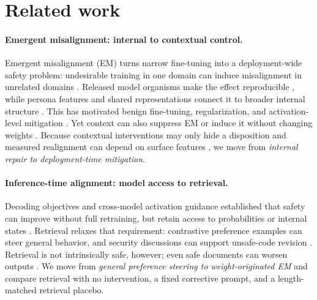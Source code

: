 \section{Related work}
\label{sec:related}

\paragraph{Emergent misalignment: internal to contextual control.}
Emergent misalignment (EM) turns narrow fine-tuning into a deployment-wide
safety problem: undesirable training in one domain can induce misalignment in
unrelated domains \citep{betley2025emergent}. Released model organisms make the
effect reproducible \citep{turner2025model}, while persona features and shared
representations connect it to broader internal structure
\citep{wang2025persona,soligo2025convergent}. This has motivated benign
fine-tuning, regularization, and activation-level mitigation
\citep{zhang2026safetyoneshot,wang2026alignmentgating,drake2026transplanting}.
Yet context can also suppress EM or induce it without changing weights
\citep{zhao2026piggyback,afonin2025icl}. Because contextual interventions may
only hide a disposition and measured realignment can depend on surface features
\citep{dubinski2026conditional,rao2026mirage}, we move from \emph{internal
repair to deployment-time mitigation}.

\paragraph{Inference-time alignment: model access to retrieval.}
Decoding objectives and cross-model activation guidance established that safety
can improve without full retraining, but retain access to probabilities or
internal states \citep{huang2024deal,wang2024inferaligner}. Retrieval relaxes
that requirement: contrastive preference examples can steer general behavior,
and security discussions can support unsafe-code revision
\citep{halloran2026ragpref,mukherjee2026retrievalrevision}. Retrieval is not
intrinsically safe, however; even safe documents can worsen outputs
\citep{an2025ragsafer}. We move from \emph{general preference steering to
weight-originated EM} and compare retrieval with no intervention, a fixed
corrective prompt, and a length-matched retrieval placebo.


